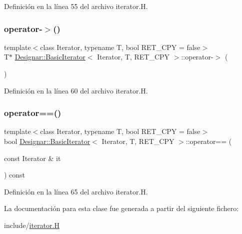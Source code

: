Definición en la línea 55 del archivo iterator.\+H.

\mbox{\label{class_designar_1_1_basic_iterator_ac87226512fbbe7c524cc0be8ae2ee914}} 
\subsubsection{\texorpdfstring{operator-\/$>$()}{operator->()}}
{\footnotesize\ttfamily template$<$class Iterator, typename T, bool R\+E\+T\+\_\+\+C\+PY = false$>$ \\
T$\ast$ \hyperlink{class_designar_1_1_basic_iterator}{Designar\+::\+Basic\+Iterator}$<$ Iterator, T, R\+E\+T\+\_\+\+C\+PY $>$\+::operator-\/$>$ (\begin{DoxyParamCaption}{ }\end{DoxyParamCaption})\hspace{0.3cm}{\ttfamily [inline]}}



Definición en la línea 60 del archivo iterator.\+H.

\mbox{\label{class_designar_1_1_basic_iterator_abaca601c4d1d4ff27429426437abbf02}} 
\subsubsection{\texorpdfstring{operator==()}{operator==()}}
{\footnotesize\ttfamily template$<$class Iterator, typename T, bool R\+E\+T\+\_\+\+C\+PY = false$>$ \\
bool \hyperlink{class_designar_1_1_basic_iterator}{Designar\+::\+Basic\+Iterator}$<$ Iterator, T, R\+E\+T\+\_\+\+C\+PY $>$\+::operator== (\begin{DoxyParamCaption}\item[{const Iterator \&}]{it }\end{DoxyParamCaption}) const\hspace{0.3cm}{\ttfamily [inline]}}



Definición en la línea 65 del archivo iterator.\+H.



La documentación para esta clase fue generada a partir del siguiente fichero\+:\begin{DoxyCompactItemize}
\item 
include/\hyperlink{iterator_8_h}{iterator.\+H}\end{DoxyCompactItemize}
